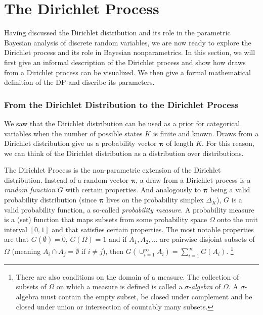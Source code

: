 \documentclass[final,3p,times,twocolumn]{elsarticle}
\let\bs\boldsymbol
\begin{document}
\section{The Dirichlet Process}
\label{sect:dp}
Having discussed the Dirichlet distribution and its role in the parametric Bayesian analysis of discrete random variables, we are now ready to explore the Dirichlet process and its role in Bayesian nonparametrics.
In this section, we will first give an informal description of the Dirichlet process and show how draws from a Dirichlet process can be visualized.
We then give a formal mathematical definition of the DP and discribe its parameters.

\subsubsection*{\normalfont \small \bfseries From the Dirichlet Distribution to the Dirichlet Process}
We saw that the Dirichlet distribution can be used as a prior for categorical variables when the number of possible states $K$ is finite and known. Draws from a Dirichlet distribution give us a probability vector $\bs \pi$ of length $K$. For this reason, we can think of the Dirichlet distribution as a distribution over distributions.

The Dirichlet Process is the non-parametric extension of the Dirichlet distribution.
Instead of a random vector $\bs \pi$, a draw from a Dirichlet process is a \emph{random function} $G$ with certain properties.
And analogously to $\bs \pi$ being a valid probability distribution (since $\bs \pi$ lives on the probability simplex $\Delta_K$), $G$ is a valid probability function, a so-called \emph{probability measure}.
A probability measure is a (set) function that maps subsets from some probability space $\Omega$ onto the unit interval $[0,1]$ and that satisfies certain properties.
The most notable properties are that $G(\emptyset)=0$, $G(\Omega)=1$ and if $A_1,A_2,\dots$ are pairwise disjoint subsets of $\Omega$ (meaning $A_i\cap A_j = \emptyset$ if $i\neq j$), then $G(\cup_{i=1}^\infty A_i) = \sum_{i=1}^\infty G(A_i)$.
\footnote{There are also conditions on the domain of a measure.
The collection of subsets of $\Omega$ on which a measure is defined is called a \emph{$\sigma$-algebra} of $\Omega$.
A $\sigma$-algebra must contain the empty subset, be closed under complement and be closed under union or intersection of countably many subsets.}
\end{document}
